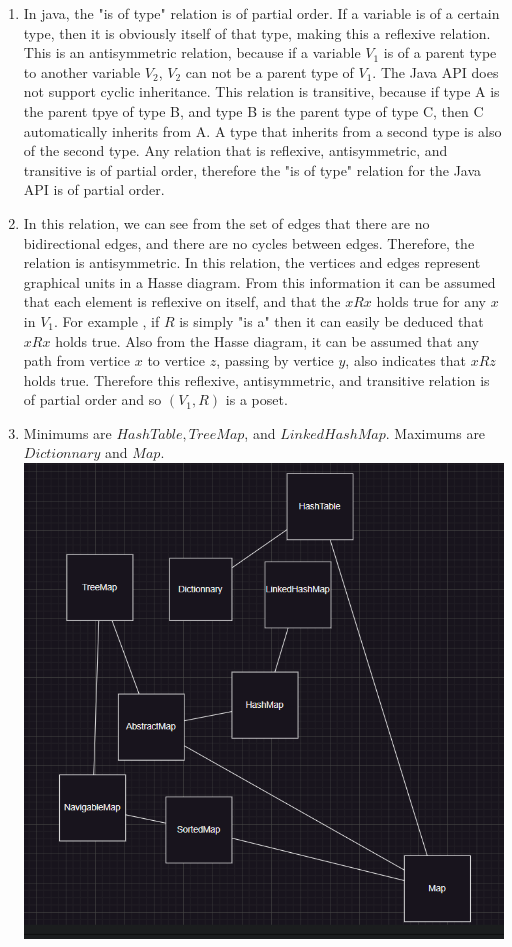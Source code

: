 \documentclass[12pt]{article}
\begin{document}
\begin{enumerate}
\item In java, the "is of type" relation is of partial order. If a variable is of a certain type, then it is obviously itself of that type, making this a reflexive relation. This is an antisymmetric relation, because if a variable $V_{1}$ is of a parent type to another variable $V_{2}$,   $V_{2}$ can not be a parent type of $V_{1}$. The Java API does not support cyclic inheritance. This relation is transitive, because if type A is the parent tpye of type B, and type B is the parent type of type C, then C automatically inherits from A. A type that inherits from a second type is also of the second type. Any relation that is reflexive, antisymmetric, and transitive is of partial order, therefore the "is of type" relation for the Java API is of partial order.
\item In this relation, we can see from the set of edges that there are no bidirectional edges, and there are no cycles between edges. Therefore, the relation is antisymmetric. In this relation, the vertices and edges represent graphical units in a Hasse diagram. From this information it can be assumed that each element is reflexive on itself, and that the $xRx$ holds true for any $x$ in $V_{1}$. For example , if $R$ is simply "is a" then it can easily be deduced that $xRx$ holds true. Also from the Hasse diagram, it can be assumed that any path from vertice $x$ to vertice $z$, passing by vertice $y$, also indicates that $xRz$ holds true. Therefore this reflexive, antisymmetric, and transitive relation is of partial order and so $(V_{1},R)$ is a poset.
\item Minimums are $HashTable, TreeMap$, and $LinkedHashMap$. Maximums are $Dictionnary$ and $Map$.\\
\includegraphics{P6P1Q3.png}\\

\end{enumerate}
\end{document}

